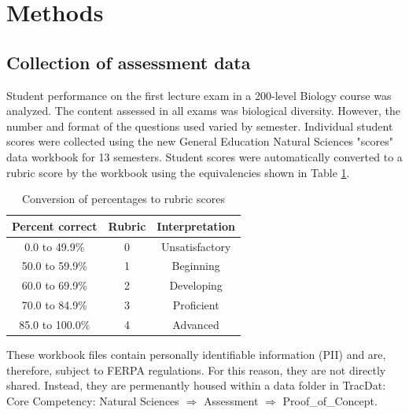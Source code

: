 \documentclass[fleqn,10pt]{SelfArx}\usepackage[]{graphicx}\usepackage[]{color}
\begin{document}

\section{Methods}

\subsection{Collection of assessment data}
Student performance on the first lecture exam in a 200-level Biology course was analyzed. The content assessed in all exams was biological diversity. However, the number and format of the questions used varied by semester. Individual student scores were collected using the new General Education Natural Sciences "scores" data workbook for 13 semesters. Student scores were automatically converted to a rubric score by the workbook using the equivalencies shown in Table \ref{tab:convert}.

\begin{table}[hbt]
\caption{Conversion of percentages to rubric scores}
\centering
\begin{tabular}{c c c}
\textbf{Percent correct} & \textbf{Rubric} & \textbf{Interpretation}   \\
\hline
 0.0 to 49.9\%   &   0   &   Unsatisfactory                                \\
50.0 to 59.9\%   &   1   &   Beginning                                     \\
60.0 to 69.9\%   &   2   &   Developing                                    \\
70.0 to 84.9\%   &   3   &   Proficient                                    \\
85.0 to 100.0\%  &   4   &   Advanced                                      \\
\end{tabular}
\label{tab:convert}
\end{table}

These workbook files contain personally identifiable information (PII) and are, therefore, subject to FERPA regulations. For this reason, they are not directly shared. Instead, they are permenantly housed within a data folder in TracDat: Core Competency: Natural Sciences $\Rightarrow$ Assessment $\Rightarrow$ Proof\_of\_Concept.
\end{document}
